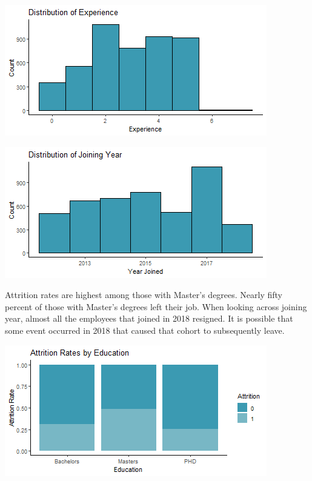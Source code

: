 \documentclass[11pt,preprint, authoryear]{elsarticle}
\let\origfigure\figure
\let\endorigfigure\endfigure
\renewenvironment{figure}[1][2] {
    \expandafter\origfigure\expandafter[H]
} {
    \endorigfigure
}
\numberwithin{equation}{section}
\numberwithin{figure}{section}
\numberwithin{table}{section}
\begin{document}
\begin{figure}[H]

{\centering \includegraphics{Final_project_files/figure-latex/Figure4-1} 

}

\caption{Experience Distribution \label{Figure4}}\label{fig:Figure4}
\end{figure}

\begin{figure}[H]

{\centering \includegraphics{Final_project_files/figure-latex/Figure5-1} 

}

\caption{Joining Year Distribution \label{Figure5}}\label{fig:Figure5}
\end{figure}

Attrition rates are highest among those with Master's degrees. Nearly
fifty percent of those with Master's degrees left their job. When
looking across joining year, almost all the employees that joined in
2018 resigned. It is possible that some event occurred in 2018 that
caused that cohort to subsequently leave.

\begin{figure}[H]

{\centering \includegraphics{Final_project_files/figure-latex/Figure6-1} 

}

\caption{Attrition by Education \label{Figure6}}\label{fig:Figure6}
\end{figure}
\end{document}
